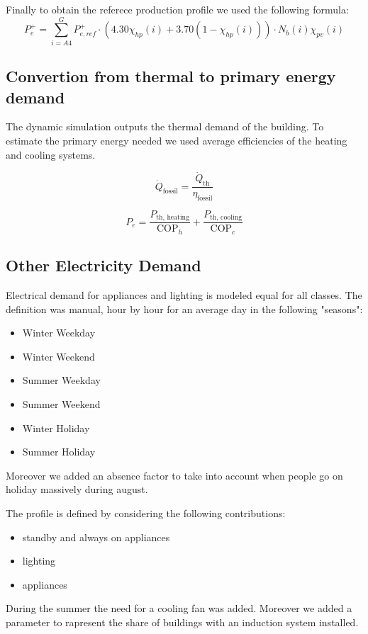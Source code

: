 Finally to obtain the referece production profile we used the following formula:
\begin{equation}
    P_{e}^+ 
    = 
    \sum_{i=A4}^{G}
    P_{e,ref}^+ 
    \cdot 
    \left( 4.30 \chi_{hp}(i) + 3.70 (1-\chi_{hp}(i)) \right)
    \cdot
    N_{b}(i) \chi_{pv}(i)
\end{equation}


\subsection{Convertion from thermal to primary energy demand}
The dynamic simulation outputs the thermal demand of the building. 
To estimate the primary energy needed we used average efficiencies of the heating and cooling systems.

\begin{equation}
    \dot{Q}_{\text{fossil}} = \frac{\dot{Q}_{\text{th}}}{\eta_{\text{fossil}}}
\end{equation}

\begin{equation}
    P_e = \frac{P_{\text{th, heating}}}{\text{COP}_{h}} + \frac{P_{\text{th, cooling}}}{\text{COP}_{c}}
\end{equation}

\subsection{Other Electricity Demand}
Electrical demand for appliances and lighting is modeled equal for all classes.
The definition was manual, hour by hour for an average day in the following "seasons":
\begin{itemize}
    \item Winter Weekday
    \item Winter Weekend
    \item Summer Weekday
    \item Summer Weekend
    \item Winter Holiday
    \item Summer Holiday
\end{itemize}
Moreover we added an absence factor to take into account when people go on holiday massively during august.

The profile is defined by considering the following contributions:
\begin{itemize}
    \item standby and always on appliances
    \item lighting 
    \item appliances
\end{itemize}
During the summer the need for a cooling fan was added.  
Moreover we added a parameter to rapresent the share of buildings with an induction system installed.

